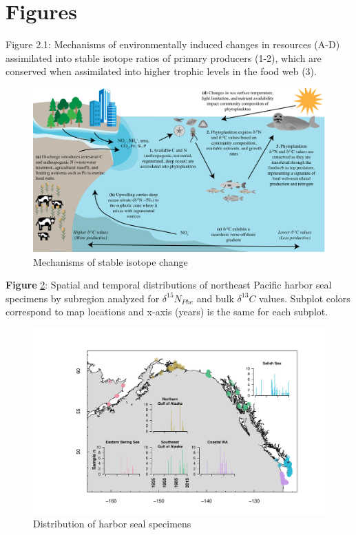 \documentclass [11pt, proquest] {uwthesis}[2015/03/03]
\begin{document}
\clearpage

\section{Figures}\label{figures-1}
\begin{landscape}

Figure 2.1: Mechanisms of environmentally induced changes in resources (A-D) assimilated into stable isotope ratios of primary producers (1-2), which are conserved when assimilated into higher trophic levels in the food web (3).\newline 
\begin{figure}[h]
\centering
  \includegraphics[width=1.1\textwidth]{figure/Ch2/Figure1.pdf}
  \caption{Mechanisms of stable isotope change}
  \label{fig:theo}
\end{figure}
\end{landscape}
\clearpage

\textbf{Figure} \ref{fig:map}: Spatial and temporal distributions of
northeast Pacific harbor seal specimens by subregion analyzed for
\(\delta^{15}N_{Phe}\) and bulk \(\delta^{13}C\) values. Subplot colors
correspond to map locations and x-axis (years) is the same for each
subplot.\newline 
\begin{figure}[h]
\centering
  \includegraphics[width=1.2\textwidth]{figure/Ch2/Fig2_Map.pdf}
  \caption{Distribution of harbor seal specimens}
  \label{fig:map}
\end{figure}
\clearpage
\end{document}
